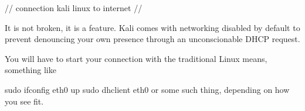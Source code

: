 // connection kali linux to internet //

It is not broken, it is a feature. Kali comes with networking disabled by default to prevent denouncing your own presence through an unconscionable DHCP request.

You will have to start your connection with the traditional Linux means, something like

 sudo ifconfig eth0 up
 sudo dhclient eth0
or some such thing, depending on how you see fit.
